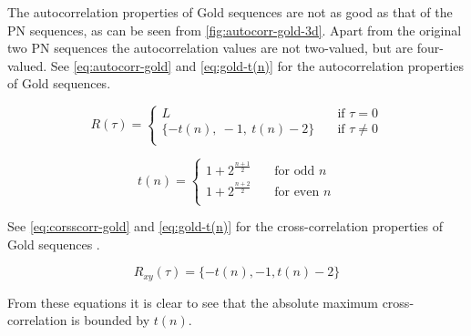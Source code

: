 The autocorrelation properties of Gold sequences are not as good as that of the PN sequences, as can be seen from \autoref{fig:autocorr-gold-3d}.
Apart from the original two PN sequences the autocorrelation values are not two-valued, but are four-valued.
See \autoref{eq:autocorr-gold} and \autoref{eq:gold-t(n)} for the autocorrelation properties of Gold sequences.

\begin{equation}
	\label{eq:autocorr-gold}
	R(\tau) = 
		\begin{cases}
			L    							& \quad \text{if } \tau = 0 \\
			\{ -t(n), \ -1, \ t(n) - 2  \} 	& \quad \text{if } \tau \neq 0 \\
		\end{cases}
\end{equation}

\begin{equation}
	\label{eq:gold-t(n)}
	t(n) = 
		\begin{cases}
			1 + 2^{\frac{n+1}{2}} & \quad \text{for odd } n \\
			1 + 2^{\frac{n+2}{2}} & \quad \text{for even } n \\
		\end{cases}
\end{equation}

See \autoref{eq:corsscorr-gold} and \autoref{eq:gold-t(n)} for the cross-correlation properties of Gold sequences \cite{mitra2008pseudo}.

\begin{equation}
	\label{eq:corsscorr-gold}
	R_{xy}(\tau) = 	\{ -t(n), -1, t(n) - 2  \} 
\end{equation}


From these equations it is clear to see that the absolute maximum cross-correlation is bounded by $t(n)$.





%
%
%
%		
%



